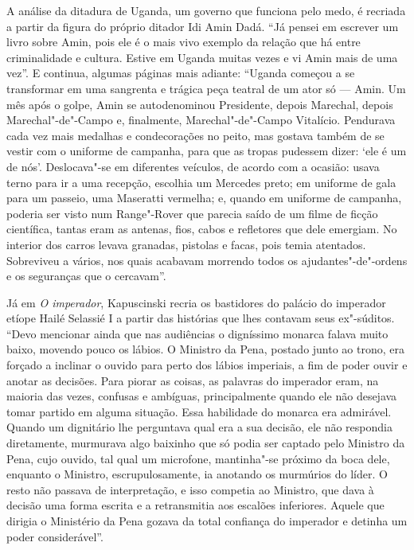 A análise da ditadura de Uganda, um governo que funciona pelo
medo, é recriada a partir da figura do próprio ditador Idi Amin Dadá.
``Já pensei em escrever um livro sobre Amin, pois ele é o mais vivo
exemplo da relação que há entre criminalidade e cultura. Estive em
Uganda muitas vezes e vi Amin mais de uma vez''. E continua, algumas
páginas mais adiante: ``Uganda começou a se transformar em uma sangrenta
e trágica peça teatral de um ator só --- Amin. Um mês após o golpe, Amin
se autodenominou Presidente, depois Marechal, depois Marechal"-de"-Campo
e, finalmente, Marechal"-de"-Campo Vitalício. Pendurava cada vez mais
medalhas e condecorações no peito, mas gostava também de se vestir com o
uniforme de campanha, para que as tropas pudessem dizer: `ele é um de
nós'. Deslocava"-se em diferentes veículos, de acordo com a ocasião:
usava terno para ir a uma recepção, escolhia um Mercedes preto; em
uniforme de gala para um passeio, uma Maseratti vermelha; e, quando em
uniforme de campanha, poderia ser visto num Range"-Rover que parecia
saído de um filme de ficção científica, tantas eram as antenas, fios,
cabos e refletores que dele emergiam. No interior dos carros levava
granadas, pistolas e facas, pois temia atentados. Sobreviveu a vários,
nos quais acabavam morrendo todos os ajudantes"-de"-ordens e os seguranças
que o cercavam''.

Já em \emph{O imperador}, Kapuscinski recria os bastidores do palácio do
imperador etíope Hailé Selassié I a partir das histórias que lhes
contavam seus ex"-súditos. ``Devo mencionar ainda que nas audiências o
digníssimo monarca falava muito baixo, movendo pouco os lábios. O
Ministro da Pena, postado junto ao trono, era forçado a inclinar o
ouvido para perto dos lábios imperiais, a fim de poder ouvir e anotar as
decisões. Para piorar as coisas, as palavras do imperador eram, na
maioria das vezes, confusas e ambíguas, principalmente quando ele não
desejava tomar partido em alguma situação. Essa habilidade do monarca
era admirável. Quando um dignitário lhe perguntava qual era a sua
decisão, ele não respondia diretamente, murmurava algo baixinho que só
podia ser captado pelo Ministro da Pena, cujo ouvido, tal qual um
microfone, mantinha"-se próximo da boca dele, enquanto o Ministro,
escrupulosamente, ia anotando os murmúrios do líder. O resto não passava
de interpretação, e isso competia ao Ministro, que dava à decisão uma
forma escrita e a retransmitia aos escalões inferiores. Aquele que
dirigia o Ministério da Pena gozava da total confiança do imperador e
detinha um poder considerável''.

